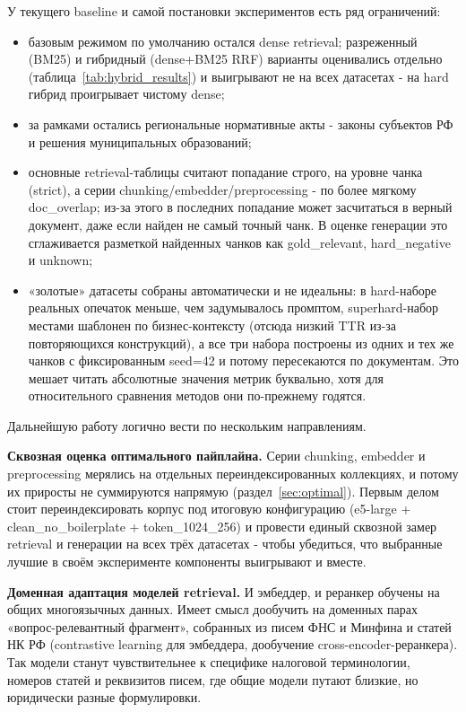 \documentclass[a4paper,12pt]{article}
\begin{document}
У текущего baseline и самой постановки экспериментов есть ряд ограничений:
\begin{itemize}
  \item базовым режимом по умолчанию остался dense retrieval; разреженный (BM25) и гибридный (dense+BM25 RRF) варианты оценивались отдельно (таблица~\ref{tab:hybrid_results}) и выигрывают не на всех датасетах - на hard гибрид проигрывает чистому dense;
  \item за рамками остались региональные нормативные акты - законы субъектов РФ и решения муниципальных образований;
  \item основные retrieval-таблицы считают попадание строго, на уровне чанка (strict), а серии chunking/embedder/preprocessing - по более мягкому doc\_overlap; из-за этого в последних попадание может засчитаться в верный документ, даже если найден не самый точный чанк. В оценке генерации это сглаживается разметкой найденных чанков как gold\_relevant, hard\_negative и unknown;
  \item «золотые» датасеты собраны автоматически и не идеальны: в hard-наборе реальных опечаток меньше, чем задумывалось промптом, superhard-набор местами шаблонен по бизнес-контексту (отсюда низкий TTR из-за повторяющихся конструкций), а все три набора построены из одних и тех же чанков с фиксированным seed=42 и потому пересекаются по документам. Это мешает читать абсолютные значения метрик буквально, хотя для относительного сравнения методов они по-прежнему годятся.
\end{itemize}

Дальнейшую работу логично вести по нескольким направлениям.

\textbf{Сквозная оценка оптимального пайплайна.} Серии chunking, embedder и preprocessing мерялись на отдельных переиндексированных коллекциях, и потому их приросты не суммируются напрямую (раздел~\ref{sec:optimal}). Первым делом стоит переиндексировать корпус под итоговую конфигурацию (e5-large + clean\_no\_boilerplate + token\_1024\_256) и провести единый сквозной замер retrieval и генерации на всех трёх датасетах - чтобы убедиться, что выбранные лучшие в своём эксперименте компоненты выигрывают и вместе.

\textbf{Доменная адаптация моделей retrieval.} И эмбеддер, и реранкер обучены на общих многоязычных данных. Имеет смысл дообучить на доменных парах «вопрос-релевантный фрагмент», собранных из писем ФНС и Минфина и статей НК РФ (contrastive learning для эмбеддера, дообучение cross-encoder-реранкера). Так модели станут чувствительнее к специфике налоговой терминологии, номеров статей и реквизитов писем, где общие модели путают близкие, но юридически разные формулировки.
\end{document}
